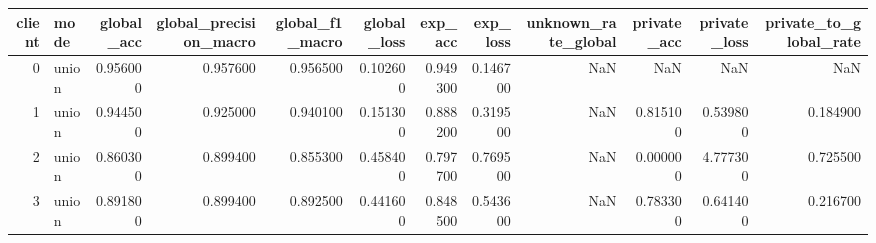 \begin{tabular}{rlrrrrrrrrrr}
\toprule
client & mode & global_acc & global_precision_macro & global_f1_macro & global_loss & exp_acc & exp_loss & unknown_rate_global & private_acc & private_loss & private_to_global_rate \\
\midrule
0 & union & 0.956000 & 0.957600 & 0.956500 & 0.102600 & 0.949300 & 0.146700 & NaN & NaN & NaN & NaN \\
1 & union & 0.944500 & 0.925000 & 0.940100 & 0.151300 & 0.888200 & 0.319500 & NaN & 0.815100 & 0.539800 & 0.184900 \\
2 & union & 0.860300 & 0.899400 & 0.855300 & 0.458400 & 0.797700 & 0.769500 & NaN & 0.000000 & 4.777300 & 0.725500 \\
3 & union & 0.891800 & 0.899400 & 0.892500 & 0.441600 & 0.848500 & 0.543600 & NaN & 0.783300 & 0.641400 & 0.216700 \\
\bottomrule
\end{tabular}
